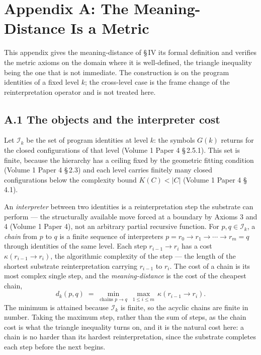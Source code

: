 \documentclass[11pt,oneside]{report}
\theoremstyle{definition}
\theoremstyle{remark}
\begin{document}
\section*{Appendix A: The Meaning-Distance Is a Metric}

This appendix gives the meaning-distance of \S\,IV its formal definition and
verifies the metric axioms on the domain where it is well-defined, the triangle
inequality being the one that is not immediate. The construction is on the
program identities of a fixed level \ensuremath{k}; the cross-level case is the
frame change of the reinterpretation operator and is not treated here.

\subsection*{A.1 The objects and the interpreter cost}

Let \ensuremath{\mathcal{I}_k} be the set of program identities at level
\ensuremath{k}: the symbols \ensuremath{G(k)} returns for the closed
configurations of that level (Volume 1 Paper 4 \S\,2.5.1). This set is finite,
because the hierarchy has a ceiling fixed by the geometric fitting condition
(Volume 1 Paper 4 \S\,2.3) and each level carries finitely many closed
configurations below the complexity bound \ensuremath{K(C) < |C|} (Volume 1
Paper 4 \S\,4.1).

An \emph{interpreter} between two identities is a reinterpretation step the
substrate can perform --- the structurally available move forced at a boundary
by Axioms 3 and 4 (Volume 1 Paper 4), not an arbitrary partial recursive
function. For \ensuremath{p, q \in \mathcal{I}_k}, a \emph{chain} from
\ensuremath{p} to \ensuremath{q} is a finite sequence of interpreters
\ensuremath{p = r_0 \to r_1 \to \cdots \to r_m = q} through identities of the
same level. Each step \ensuremath{r_{i-1} \to r_i} has a cost
\ensuremath{\kappa(r_{i-1} \to r_i)}, the algorithmic complexity of the step ---
the length of the shortest substrate reinterpretation carrying
\ensuremath{r_{i-1}} to \ensuremath{r_i}. The cost of a chain is its most
complex single step, and the \emph{meaning-distance} is the cost of the
cheapest chain,
\[
d_k(p, q) \;=\; \min_{\text{chains } p \to q}\ \max_{1 \le i \le m}\,
\kappa(r_{i-1} \to r_i).
\]
The minimum is attained because \ensuremath{\mathcal{I}_k} is finite, so the
acyclic chains are finite in number. Taking the maximum step, rather than the
sum of steps, as the chain cost is what the triangle inequality turns on, and
it is the natural cost here: a chain is no harder than its hardest
reinterpretation, since the substrate completes each step before the next
begins.
\end{document}
